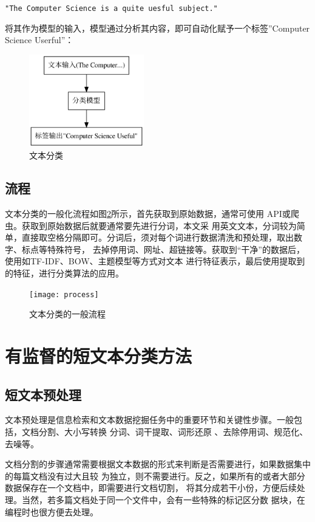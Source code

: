 \par\hspace{5em}\verb|"The Computer Science is a quite uesful subject."|\par

将其作为模型的输入，模型通过分析其内容，即可自动化赋予一个标签''Computer Science Userful''：

\begin{figure}[H]
  \centering
  \includegraphics[width=5cm]{./figs/text-classification}
  \caption{文本分类}
  \label{fig:text-classification}
\end{figure}

\subsection{流程}
文本分类的一般化流程如图\ref{fig:textclassification}所示，首先获取到原始数据，通常可使用
API或爬虫。获取到原始数据后就要通常要先进行分词，本文采
用英文文本，分词较为简单，直接取空格分隔即可。分词后，须对每个词进行数据清洗和预处理，取出数字、标点等特殊符号，
去掉停用词、网址、超链接等。获取到“干净”的数据后，使用如TF-IDF、BOW、主题模型等方式对文本
进行特征表示，最后使用提取到的特征，进行分类算法的应用。

\begin{figure}[H]
  \centering
  \texttt{[image: process]}
  \caption{文本分类的一般流程}
  \label{fig:textclassification}
\end{figure}

\section{有监督的短文本分类方法}

\subsection{短文本预处理}
文本预处理是信息检索和文本数据挖掘任务中的重要环节和关键性步骤。一般包括，文档分割、大小写转换
分词、词干提取、词形还原
、去除停用词、规范化、去噪等。

文档分割的步骤通常需要根据文本数据的形式来判断是否需要进行，如果数据集中的每篇文档没有过大且较
为独立，则不需要进行。反之，如果所有的或者大部分数据保存在一个文档中，即需要进行文档切割，
将其分成若干小份，方便后续处理。当然，若多篇文档处于同一个文件中，会有一些特殊的标记区分数
据块，在编程时也很方便去处理。

